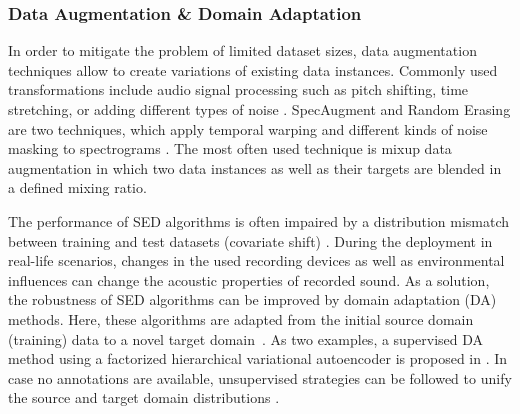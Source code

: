 \documentclass[11pt]{article}
\begin{document}
\subsubsection{Data Augmentation \& Domain Adaptation}

In order to mitigate the problem of limited dataset sizes, data augmentation techniques allow to create variations of existing data instances.
Commonly used transformations include audio signal processing such as pitch shifting, time stretching, or adding different types of noise  \cite{Salamon:2017:ASC:SPL, Xu:2018:ASCMobileNet:ISM}.
SpecAugment and Random Erasing are two techniques, which apply temporal warping and different kinds of noise masking to spectrograms \cite{Park:2019:SpecAugment:INTERSPEECH,Zhong:2017:RandomErasing:ARXIV}.
The most often used technique is mixup data augmentation \cite{Zhang:2018:Mixup:ICLR} in which two data instances as well as their targets are blended in a defined mixing ratio.


The performance of SED algorithms is often impaired by a distribution mismatch between training and test datasets (covariate shift) .
During the deployment in real-life scenarios, changes in the used recording devices as well as environmental influences can change the acoustic properties of recorded sound.
As a solution, the robustness of SED algorithms can be improved by domain adaptation (DA) methods. Here, these algorithms are adapted from the initial source domain (training) data to a novel target domain~\cite{Gharib:2018:DomainAdaptationASC:DCASE}.
As two examples, a supervised DA method using a factorized hierarchical variational autoencoder is proposed in \cite{Mun:2019:DomainMismatch:ICASSP}.
In case no annotations are available, unsupervised strategies can be followed to unify the source and target domain distributions \cite{Gharib:2018:DomainAdaptationASC:DCASE, Drossos:2019:DomainAdaptation:WASPAA}.
\end{document}
